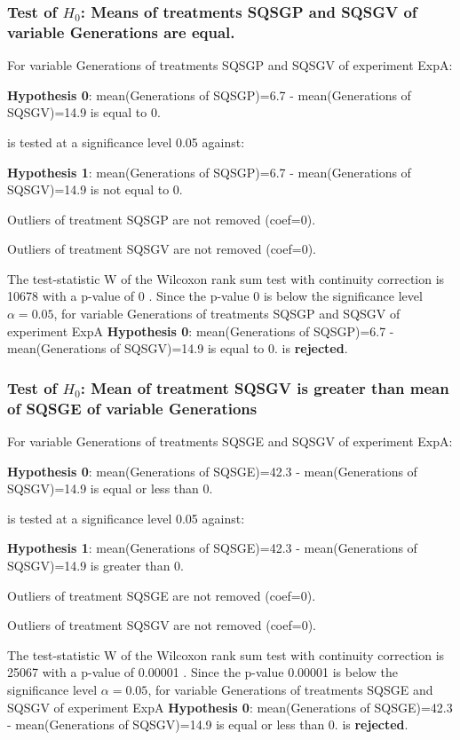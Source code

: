 \documentclass[18pt,c]{beamer}
\begin{document}
\begin{frame}[t]
 \frametitle{Test of $H_{0}$: Means of treatments SQSGP and SQSGV of variable Generations are equal. }
 \scriptsize
 For variable Generations of treatments SQSGP and SQSGV of experiment ExpA:

\vspace{1mm}
{\bf Hypothesis 0}: mean(Generations of SQSGP)=6.7 - mean(Generations of SQSGV)=14.9 is equal to 0.


 \begin{center} is tested at a significance level 0.05 against: \end{center}

{\bf Hypothesis 1}: mean(Generations of SQSGP)=6.7 - mean(Generations of SQSGV)=14.9 is not equal to 0.
\vspace{1mm}
\vspace{1mm}

 Outliers of treatment SQSGP  are not removed (coef=0).

 Outliers of treatment SQSGV  are not removed (coef=0).
\vspace{1mm}
 
 The test-statistic W of the Wilcoxon rank sum test with continuity correction is 10678 with a p-value of 0 .
 Since the p-value 0 is below the significance level $\alpha= 0.05 $,
 for variable Generations of treatments SQSGP and SQSGV of experiment ExpA 
 {\bf Hypothesis 0}: mean(Generations of SQSGP)=6.7 - mean(Generations of SQSGV)=14.9 is equal to 0.
is {\bf rejected}.

 \end{frame}
\begin{frame}[t]
 \frametitle{Test of $H_{0}$: Mean of treatment SQSGV is greater than mean of SQSGE of variable Generations }
 \scriptsize
 For variable Generations of treatments SQSGE and SQSGV of experiment ExpA:

\vspace{1mm}
{\bf Hypothesis 0}: mean(Generations of SQSGE)=42.3 - mean(Generations of SQSGV)=14.9 is equal or less than 0.


 \begin{center} is tested at a significance level 0.05 against: \end{center}

{\bf Hypothesis 1}: mean(Generations of SQSGE)=42.3 - mean(Generations of SQSGV)=14.9 is greater than 0.
\vspace{1mm}
\vspace{1mm}

 Outliers of treatment SQSGE  are not removed (coef=0).

 Outliers of treatment SQSGV  are not removed (coef=0).
\vspace{1mm}
 
 The test-statistic W of the Wilcoxon rank sum test with continuity correction is 25067 with a p-value of 0.00001 .
 Since the p-value 0.00001 is below the significance level $\alpha= 0.05 $,
 for variable Generations of treatments SQSGE and SQSGV of experiment ExpA 
 {\bf Hypothesis 0}: mean(Generations of SQSGE)=42.3 - mean(Generations of SQSGV)=14.9 is equal or less than 0.
is {\bf rejected}.

 \end{frame}
\end{document}
